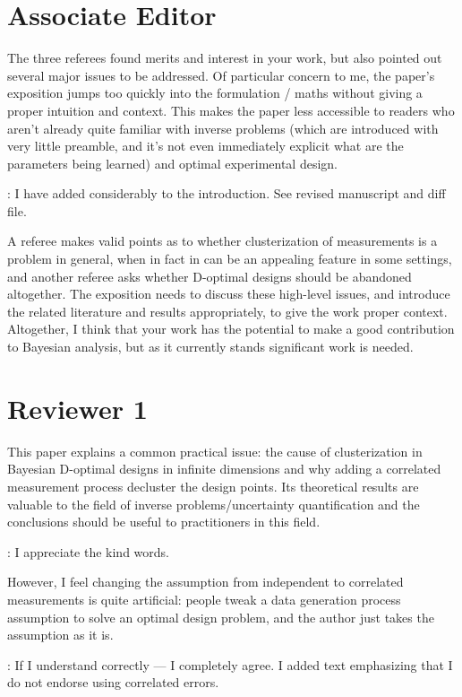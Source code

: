 \documentclass{amsart}
\begin{document}
\section{Associate Editor}
The three referees found merits and interest in your work, but also
pointed out several major issues to be addressed. Of particular
concern to me, the paper's exposition jumps too quickly into the
formulation / maths without giving a proper intuition and
context. This makes the paper less accessible to readers who aren't
already quite familiar with inverse problems (which are introduced
with very little preamble, and it's not even immediately explicit what
are the parameters being learned) and optimal experimental design.

\answer: I have added considerably to the introduction. See revised
manuscript and diff file.

A referee makes valid points as to whether clusterization of
measurements is a problem in general, when in fact in can be an
appealing feature in some settings, and another referee asks whether
D-optimal designs should be abandoned altogether. The exposition needs
to discuss these high-level issues, and introduce the related
literature and results appropriately, to give the work proper
context. Altogether, I think that your work has the potential to make
a good contribution to Bayesian analysis, but as it currently stands
significant work is needed.



\section{Reviewer 1}
This paper explains a common practical issue: the cause of
clusterization in Bayesian D-optimal designs in infinite dimensions
and why adding a correlated measurement process decluster the design
points. Its theoretical results are valuable to the field of inverse
problems/uncertainty quantification and the conclusions should be
useful to practitioners in this field.

\answer: I appreciate the kind words.

However, I feel changing the assumption from independent to correlated
measurements is quite artificial: people tweak a data generation
process assumption to solve an optimal design problem, and the author
just takes the assumption as it is.

\answer: If I understand correctly --- I completely agree. I added
text emphasizing that I do not endorse using correlated errors.
\end{document}
